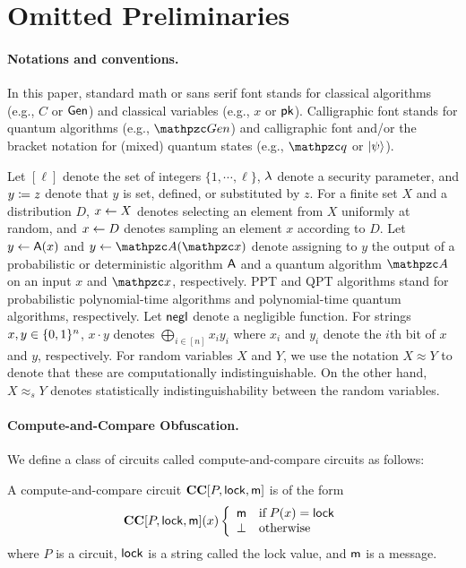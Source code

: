 
\section{Omitted Preliminaries}\label{sec:omitted_prelim}
\paragraph{Notations and conventions.}
In this paper, standard math or sans serif font stands for classical algorithms (e.g., $C$ or $\mathsf{Gen}$) and classical variables (e.g., $x$ or $\mathsf{pk}$).
Calligraphic font stands for quantum algorithms (e.g., $\qalgo{Gen}$) and calligraphic font and/or the bracket notation for (mixed) quantum states (e.g., $\qstate{q}$ or $\ket{\psi}$).

Let $[\ell]$ denote the set of integers $\{1, \cdots, \ell \}$, $\lambda$ denote a security parameter, and $y \coloneqq z$ denote that $y$ is set, defined, or substituted by $z$.
For a finite set $X$ and a distribution $D$, $x \leftarrow X$ denotes selecting an element from $X$ uniformly at random, and $x \leftarrow D$ denotes sampling an element $x$ according to $D$. Let $y \leftarrow \mathsf{A}(x)$ and $y \gets \qalgo{A}(\qstate{x})$ denote assigning to $y$ the output of a probabilistic or deterministic algorithm $\mathsf{A}$ and a quantum algorithm $\qalgo{A}$ on an input $x$ and $\qstate{x}$, respectively.
PPT and QPT algorithms stand for probabilistic polynomial-time algorithms and polynomial-time quantum algorithms, respectively.
Let ${\mathsf{negl}}$ denote a negligible function.
For strings $x,y\in \{0,1\}^n$, $x\cdot y$ denotes $\bigoplus_{i\in[n]} x_i y_i$ where $x_i$ and $y_i$ denote the $i$th bit of $x$ and $y$, respectively. 
 For random variables $X$ and $Y$, we use the notation $X \approx Y$ to denote that these are computationally indistinguishable. On the other hand, $X \approx_s Y$ denotes statistically indistinguishability between the random variables.

\paragraph{Compute-and-Compare Obfuscation.}
We define a class of circuits called compute-and-compare circuits as
follows:

\begin{definition}\label{def:cc_circuits_searchability}
A compute-and-compare circuit $\mathbf{CC}[P,\mathsf{lock},\mathsf{m}]$ is of the form
\[
\mathbf{CC}[P,\mathsf{lock},\mathsf{m}](x)\left\{
\begin{array}{ll}
    \mathsf{m}&\textrm{if}\; P(x)=\mathsf{lock}\\
\bot&\text{otherwise}~
\end{array}
\right.
\]
where $P$ is a circuit, $\mathsf{lock}$ is a string called the lock value,
and $\mathsf{m}$ is a message.
\end{definition}

